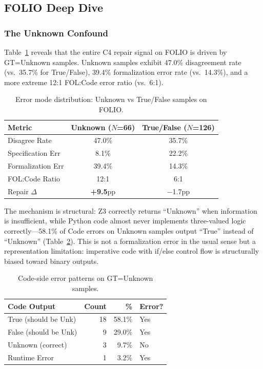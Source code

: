 \documentclass[11pt,a4paper]{article}
\newcommand{\pp}{\text{pp}}
\begin{document}
\subsection{FOLIO Deep Dive}
\label{sec:folio}

\subsubsection{The Unknown Confound}

Table~\ref{tab:unknown} reveals that the entire C4 repair signal on FOLIO is driven by GT=Unknown samples. Unknown samples exhibit 47.0\% disagreement rate (vs.\ 35.7\% for True/False), 39.4\% formalization error rate (vs.\ 14.3\%), and a more extreme 12:1 FOL:Code error ratio (vs.\ 6:1).

\begin{table}[t]
\centering
\small
\caption{Error mode distribution: Unknown vs True/False samples on FOLIO.}
\label{tab:unknown}
\begin{tabular}{lcc}
\toprule
\textbf{Metric} & \textbf{Unknown} ($N$=66) & \textbf{True/False} ($N$=126) \\
\midrule
Disagree Rate & 47.0\% & 35.7\% \\
Specification Err & 8.1\% & 22.2\% \\
Formalization Err & 39.4\% & 14.3\% \\
FOL:Code Ratio & 12:1 & 6:1 \\
Repair $\Delta$ & \textbf{+9.5$\pp$} & $-$1.7$\pp$ \\
\bottomrule
\end{tabular}
\end{table}

The mechanism is structural: Z3 correctly returns ``Unknown'' when information is insufficient, while Python code almost never implements three-valued logic correctly---58.1\% of Code errors on Unknown samples output ``True'' instead of ``Unknown'' (Table~\ref{tab:code_errors}). This is not a formalization error in the usual sense but a representation limitation: imperative code with if/else control flow is structurally biased toward binary outputs.

\begin{table}[t]
\centering
\small
\caption{Code-side error patterns on GT=Unknown samples.}
\label{tab:code_errors}
\begin{tabular}{lrrl}
\toprule
\textbf{Code Output} & \textbf{Count} & \textbf{\%} & \textbf{Error?} \\
\midrule
True (should be Unk) & 18 & 58.1\% & Yes \\
False (should be Unk) & 9 & 29.0\% & Yes \\
Unknown (correct) & 3 & 9.7\% & No \\
Runtime Error & 1 & 3.2\% & Yes \\
\bottomrule
\end{tabular}
\end{table}
\end{document}

